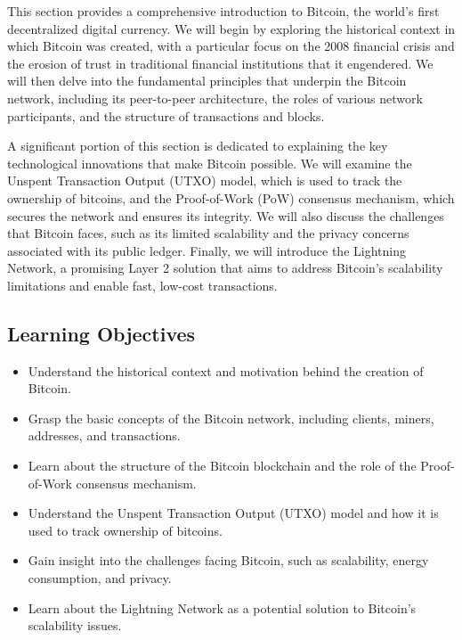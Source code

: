 This section provides a comprehensive introduction to Bitcoin, the
world's first decentralized digital currency. We will begin by exploring
the historical context in which Bitcoin was created, with a particular
focus on the 2008 financial crisis and the erosion of trust in
traditional financial institutions that it engendered. We will then
delve into the fundamental principles that underpin the Bitcoin network,
including its peer-to-peer architecture, the roles of various network
participants, and the structure of transactions and blocks.

A significant portion of this section is dedicated to explaining the key
technological innovations that make Bitcoin possible. We will examine
the Unspent Transaction Output (UTXO) model, which is used to track the
ownership of bitcoins, and the Proof-of-Work (PoW) consensus mechanism,
which secures the network and ensures its integrity. We will also
discuss the challenges that Bitcoin faces, such as its limited
scalability and the privacy concerns associated with its public ledger.
Finally, we will introduce the Lightning Network, a promising Layer 2
solution that aims to address Bitcoin's scalability limitations and
enable fast, low-cost transactions.

\subsection{Learning Objectives}\label{learning-objectives}

\begin{itemize}
	\tightlist
	\item
	Understand the historical context and motivation behind the creation
	of Bitcoin.
	\item
	Grasp the basic concepts of the Bitcoin network, including clients,
	miners, addresses, and transactions.
	\item
	Learn about the structure of the Bitcoin blockchain and the role of
	the Proof-of-Work consensus mechanism.
	\item
	Understand the Unspent Transaction Output (UTXO) model and how it is
	used to track ownership of bitcoins.
	\item
	Gain insight into the challenges facing Bitcoin, such as scalability,
	energy consumption, and privacy.
	\item
	Learn about the Lightning Network as a potential solution to Bitcoin's
	scalability issues.
\end{itemize}

